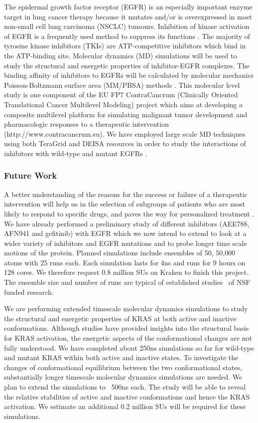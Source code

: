 \documentclass[a4paper,11pt]{article}
\begin{document}
The epidermal growth factor receptor (EGFR) is an especially important enzyme target in lung cancer therapy because it mutates and/or is overexpressed in most non-small cell lung carcinoma (NSCLC) tumours. Inhibition of kinase activation of EGFR is a frequently used method to suppress its functions \cite{bib:nature_tki}. The majority of tyrosine kinase inhibitors (TKIs) are ATP-competitive inhibitors which bind in the ATP-binding site. Molecular dynamics (MD) simulations will be used to study the structural and energetic properties of inhibitor-EGFR complexes. The binding affinity of inhibitors to EGFRs will be calculated by molecular mechanics Poisson-Boltzmann surface area (MM/PBSA) methods \cite{bib:wan_philtrans}. This molecular level study is one component of the EU FP7 ContraCancrum (Clinically Oriented Translational Cancer Multilevel Modeling) project which aims at developing a composite multilevel platform for simulating malignant tumor development and pharmacologic responses to a therapeutic intervention (http://www.contracancrum.eu). We have employed large scale MD techniques using both TeraGrid and DEISA resources in order to study the interactions of inhibitors with wild-type and mutant EGFRs \cite{bib:wc2009}.

\subsubsection{Future Work}
A better understanding of the reasons for the success or failure of a therapeutic intervention will help us in the selection of subgroups of patients who are most likely to respond to specific drugs, and paves the way for personalized treatment \cite{bib:hiv}. We have already performed a preliminary study of different inhibitors (AEE788, AFN941 and gefitinib) with EGFR which we now intend to extend to look at a wider variety of inhibitors and EGFR mutations and to probe longer time scale motions of the protein. Planned simulations include ensembles of 50, 50,000 atoms with 25 runs each. Each simulation lasts for 4ns and runs for 9 hours on 128 cores. We therefore request 0.8 million SUs on Kraken to finish this project. The ensemble size and number of runs are typical of established studies~\cite{bib:wan_philtrans,bib:wc2009} of NSF funded research.

We are performing extended timescale molecular dynamics simulations to study the structural and energetic properties of KRAS at both active and inactive conformations. Although studies have provided insights into the structural basis for KRAS activation, the energetic aspects of the conformational changes are not fully understood. We have completed about 250ns simulations so far for wild-type and mutant KRAS within both active and inactive states. To investigate the changes of conformational equilibrium between the two conformational states, substantially longer timescale molecular dynamics simulations are needed. We plan to extend the simulations to ~500ns each. The study will be able to reveal the relative stabilities of active and inactive conformations and hence the KRAS activation. We estimate an additional 0.2 million SUs will be required for these simulations.
\end{document}
